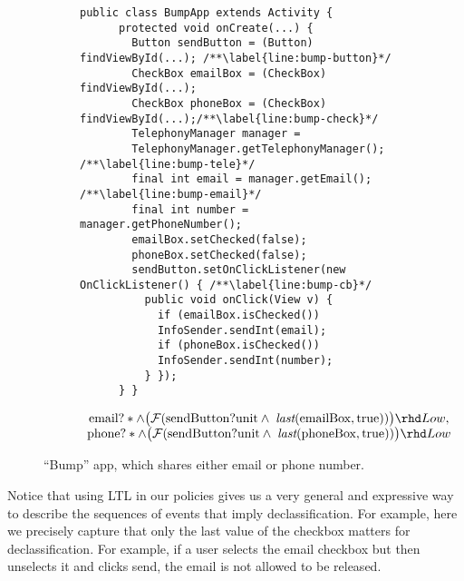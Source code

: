 \documentclass{entcs} \usepackage{entcsmacro}
\newcommand{\code}[1]{\text{\lstinline!#1!}}
\newcommand{\tfuture}{\mathcal{F}}
\newcommand{\tlast}[2]{\textit{last}(#1, #2)}
\begin{document}
\begin{figure}[t]
\centering
\begin{subfigure}[b]{0.5\textwidth}
  \begin{lstlisting}[name=Ex]
    public class BumpApp extends Activity {
      protected void onCreate(...) {
        Button sendButton = (Button) findViewById(...); /**\label{line:bump-button}*/
        CheckBox emailBox = (CheckBox) findViewById(...);
        CheckBox phoneBox = (CheckBox) findViewById(...);/**\label{line:bump-check}*/
        TelephonyManager manager = 
        TelephonyManager.getTelephonyManager(); /**\label{line:bump-tele}*/
        final int email = manager.getEmail(); /**\label{line:bump-email}*/
        final int number = manager.getPhoneNumber();
        emailBox.setChecked(false);
        phoneBox.setChecked(false);
        sendButton.setOnClickListener(new OnClickListener() { /**\label{line:bump-cb}*/
          public void onClick(View v) {
            if (emailBox.isChecked())
            InfoSender.sendInt(email); 
            if (phoneBox.isChecked())
            InfoSender.sendInt(number);
          } });
      } }
  \end{lstlisting}
\end{subfigure}
\begin{subfigure}[b]{0.5\textwidth}
  \begin{displaymath}
    \begin{array}{c}
      \code{email}?\ast \wedge \big(\tfuture ( \code{sendButton?unit} \land\;
      \tlast{\code{emailBox}}{\code{true}})\big) \rhd Low, \\

      \code{phone}?\ast \wedge \big(\tfuture ( \code{sendButton?unit} \land\;
      \tlast{\code{phoneBox}}{\code{true}})\big) \rhd Low \\
    \end{array}
  \end{displaymath}
\end{subfigure}
\caption{``Bump'' app, which shares either email or phone number.}
\label{fig:app-bump}
\end{figure}
 
Notice that using LTL in our policies gives us a very general and
expressive way to describe the sequences of events that imply
declassification. For example, here we precisely capture that
only the last value of the checkbox matters for declassification. For
example, if a user selects the email checkbox but then unselects it
and clicks send, the email is not allowed to be released.
\end{document}
